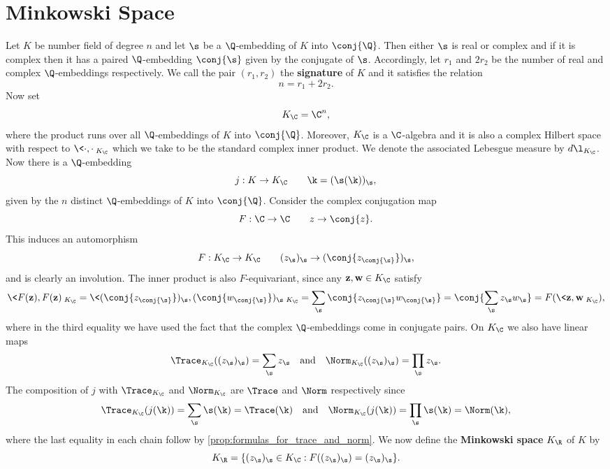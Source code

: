   \section{Minkowski Space}
    Let $K$ be number field of degree $n$ and let $\s$ be a $\Q$-embedding of $K$ into $\conj{\Q}$. Then either $\s$ is real or complex and if it is complex then it has a paired $\Q$-embedding $\conj{\s}$ given by the conjugate of $\s$. Accordingly, let $r_{1}$ and $2r_{2}$ be the number of real and complex $\Q$-embeddings respectively. We call the pair $(r_{1},r_{2})$ the \textbf{signature} of $K$ and it satisfies the relation
    \[
      n = r_{1}+2r_{2}.
    \]
    Now set
    \[
      K_{\C} = \C^{n},
    \]
    where the product runs over all $\Q$-embeddings of $K$ into $\conj{\Q}$. Moreover, $K_{\C}$ is a $\C$-algebra and it is also a complex Hilbert space with respect to $\<\cdot,\cdot\>_{K_{\C}}$ which we take to be the standard complex inner product. We denote the associated Lebesgue measure by $d\l_{K_{\C}}$. Now there is a $\Q$-embedding
    \[
      j:K \to K_{\C} \qquad \k = (\s(\k))_{\s},
    \]
    given by the $n$ distinct $\Q$-embeddings of $K$ into $\conj{\Q}$. Consider the complex conjugation map
    \[
      F:\C \to \C \qquad z \to \conj{z}.
    \]
    This induces an automorphism
    \[
      F:K_{\C} \to K_{\C} \qquad (z_{\s})_{\s} \to (\conj{z_{\conj{\s}}})_{\s},
    \]
    and is clearly an involution. The inner product is also $F$-equivariant, since any $\mathbf{z},\mathbf{w} \in K_{\C}$ satisfy
    \[
      \<F(\mathbf{z}),F(\mathbf{z})\>_{K_{\C}} = \<(\conj{z_{\conj{\s}}})_{\s},(\conj{w_{\conj{\s}}})_{\s}\>_{K_{\C}} = \sum_{\s}\conj{z_{\conj{\s}}w_{\conj{\s}}} = \conj{\sum_{\s}z_{\s}w_{\s}} = F(\<\mathbf{z},\mathbf{w}\>_{K_{\C}}),
    \]
    where in the third equality we have used the fact that the complex $\Q$-embeddings come in conjugate pairs. On $K_{\C}$ we also have linear maps
    \[
      \Trace_{K_{\C}}((z_{\s})_{\s}) = \sum_{\s}z_{\s} \quad \text{and} \quad \Norm_{K_{\C}}((z_{\s})_{\s}) = \prod_{\s}z_{\s}.
    \]
    The composition of $j$ with $\Trace_{K_{\C}}$ and $\Norm_{K_{\C}}$ are $\Trace$ and $\Norm$ respectively since
    \[
      \Trace_{K_{\C}}(j(\k)) = \sum_{\s}\s(\k) = \Trace(\k) \quad \text{and} \quad \Norm_{K_{\C}}(j(\k)) = \prod_{\s}\s(\k) = \Norm(\k),
    \]
    where the last equality in each chain follow by \cref{prop:formulas_for_trace_and_norm}. We now define the \textbf{Minkowski space} $K_{\R}$ of $K$ by
    \[
      K_{\R} = \{(z_{\s})_{\s} \in K_{\C}:F((z_{\s})_{\s}) = (z_{\s})_{\s}\}.
    \]
